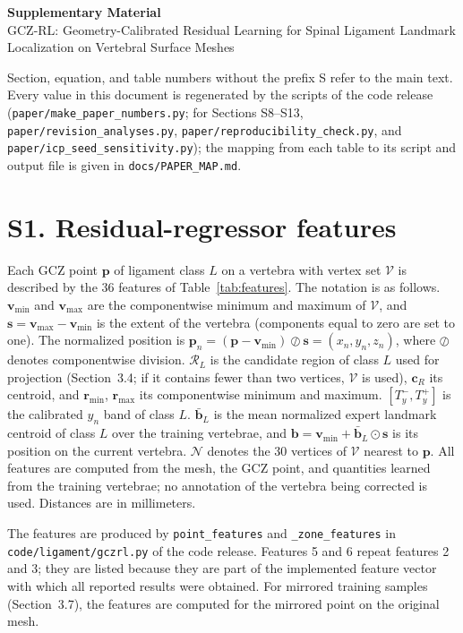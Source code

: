 \documentclass[10pt,a4paper]{article}
\begin{document}
\begin{center}
{\large\bfseries Supplementary Material}\\[2mm]
GCZ-RL: Geometry-Calibrated Residual Learning for Spinal Ligament Landmark Localization on Vertebral Surface Meshes
\end{center}

Section, equation, and table numbers without the prefix S refer to the main text. Every value in this document is regenerated by the scripts of the code release (\texttt{paper/make\_paper\_numbers.py}; for Sections S8--S13, \texttt{paper/revision\_analyses.py}, \texttt{paper/reproducibility\_check.py}, and \texttt{paper/icp\_seed\_sensitivity.py}); the mapping from each table to its script and output file is given in \texttt{docs/PAPER\_MAP.md}.

\section*{S1. Residual-regressor features}

Each GCZ point $\mathbf{p}$ of ligament class $L$ on a vertebra with vertex set $\mathcal{V}$ is described by the 36 features of Table~\ref{tab:features}. The notation is as follows. $\mathbf{v}_{\min}$ and $\mathbf{v}_{\max}$ are the componentwise minimum and maximum of $\mathcal{V}$, and $\mathbf{s}=\mathbf{v}_{\max}-\mathbf{v}_{\min}$ is the extent of the vertebra (components equal to zero are set to one). The normalized position is $\mathbf{p}_n=(\mathbf{p}-\mathbf{v}_{\min})\oslash\mathbf{s}=(x_n,y_n,z_n)$, where $\oslash$ denotes componentwise division. $\mathcal{R}_L$ is the candidate region of class $L$ used for projection (Section~3.4; if it contains fewer than two vertices, $\mathcal{V}$ is used), $\mathbf{c}_R$ its centroid, and $\mathbf{r}_{\min}$, $\mathbf{r}_{\max}$ its componentwise minimum and maximum. $[T^-_y,T^+_y]$ is the calibrated $y_n$ band of class $L$. $\bar{\mathbf{b}}_L$ is the mean normalized expert landmark centroid of class $L$ over the training vertebrae, and $\mathbf{b}=\mathbf{v}_{\min}+\bar{\mathbf{b}}_L\odot\mathbf{s}$ is its position on the current vertebra. $\mathcal{N}$ denotes the 30 vertices of $\mathcal{V}$ nearest to $\mathbf{p}$. All features are computed from the mesh, the GCZ point, and quantities learned from the training vertebrae; no annotation of the vertebra being corrected is used. Distances are in millimeters.

The features are produced by \texttt{point\_features} and \texttt{\_zone\_features} in \texttt{code/ligament/gczrl.py} of the code release. Features 5 and 6 repeat features 2 and 3; they are listed because they are part of the implemented feature vector with which all reported results were obtained. For mirrored training samples (Section~3.7), the features are computed for the mirrored point on the original mesh.
\end{document}
